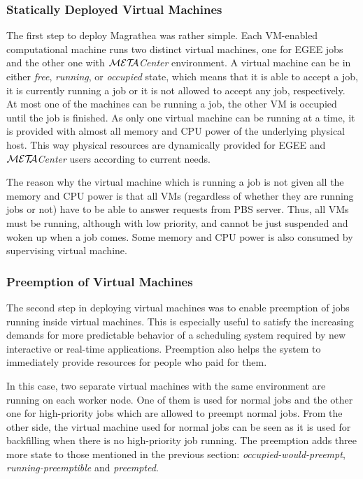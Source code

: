 \documentclass[times,10pt,twocolumn]{article}
\def\META#1{\textit{${\cal MET\!\!A}$#1}}
\begin{document}
\subsubsection{Statically Deployed Virtual Machines}

The first step to deploy Magrathea was rather simple. Each VM-enabled
computational machine runs two distinct virtual machines, one for EGEE jobs
and the other one with \META{Center} environment. A virtual machine can be in
either \textit{free}, \textit{running}, or \textit{occupied} state, which
means that it is able to accept a job, it is currently running a job or it is
not allowed to accept any job, respectively. At most one of the machines can
be running a job, the other VM is occupied until the job is finished. As only
one virtual machine can be running at a time, it is provided with almost all
memory and CPU power of the underlying physical host. This way physical
resources are dynamically provided for EGEE and \META{Center} users according
to current needs. 

The reason why the virtual machine which is running a job is not given all the
memory and CPU power is that all VMs (regardless of whether they are running
jobs or not) have to be able to answer requests from PBS server. Thus, all VMs
must be running, although with low priority, and cannot be just suspended and
woken up when a job comes. Some memory and CPU power is also consumed by
supervising virtual machine.

\subsubsection{Preemption of Virtual Machines}

The second step in deploying virtual machines was to enable preemption of jobs
running inside virtual machines. This is especially useful to satisfy the
increasing demands for more predictable behavior of a scheduling system
required by new interactive or real-time applications. Preemption also helps
the system to immediately provide resources for people who paid for them.

In this case, two separate virtual machines with the same environment are
running on each worker node. One of them is used for normal jobs and the other
one for high-priority jobs which are allowed to preempt normal jobs. From the
other side, the virtual machine used for normal jobs can be seen as it is used
for backfilling when there is no high-priority job running. The preemption
adds three more state to those mentioned in the previous section:
\textit{occupied-would-preempt}, \textit{running-preemptible} and
\textit{preempted}.
\end{document}
